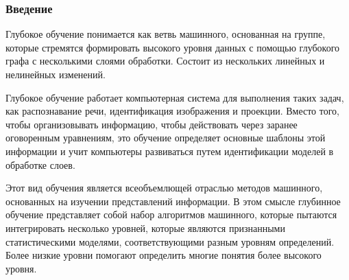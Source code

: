 \begin{frame}
    \frametitle{Введение}

    Глубокое обучение понимается как ветвь машинного, основанная на группе,
    которые стремятся формировать высокого уровня данных с помощью глубокого графа с несколькими слоями обработки. 
    Состоит из нескольких линейных и нелинейных изменений.

    Глубокое обучение работает компьютерная система для выполнения таких задач,
    как распознавание речи, идентификация изображения и проекции.
    Вместо того, чтобы организовывать информацию, чтобы действовать через заранее оговоренным уравнениям,
    это обучение определяет основные шаблоны этой информации и
    учит компьютеры развиваться путем идентификации моделей в обработке слоев.

    Этот вид обучения является всеобъемлющей отраслью методов машинного,
    основанных на изучении представлений информации.
    В этом смысле глубинное обучение представляет собой набор алгоритмов машинного,
    которые пытаются интегрировать несколько уровней,
    которые являются признанными статистическими моделями,
    соответствующими разным уровням определений.
    Более низкие уровни помогают определить многие понятия более высокого уровня.
\end{frame}